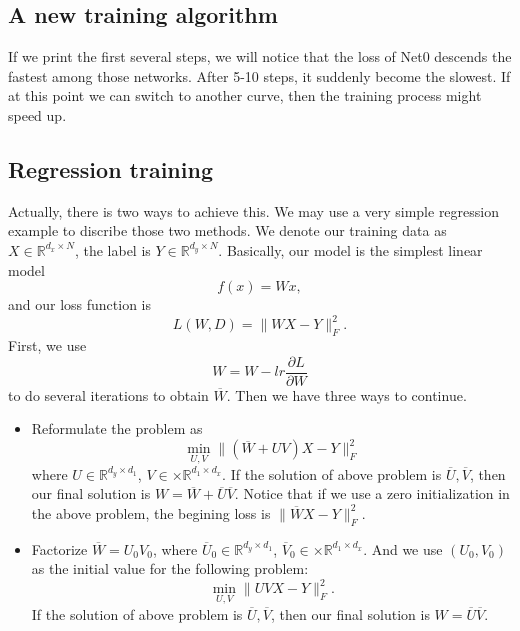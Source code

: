 \newpage
\subsection{A new training algorithm}

If we print the first several steps, we will notice that the loss of Net0 descends the fastest among those networks. After 5-10 steps, it suddenly become the slowest. If at this point we can switch to another curve, then the training process might speed up.\\

\subsection{Regression training}
Actually, there is two ways to achieve this. We may use a very simple regression example to discribe those two methods. We denote our training data as $X\in \mathbb{R}^{d_x\times N}$, the label is $Y\in \mathbb{R}^{d_y\times N}$. Basically, our model is the simplest linear model
\begin{equation}
	f(x) = Wx,
\end{equation}
and our loss function is 
\begin{equation}
	L(W, D) = \|WX - Y\|_F^2.
\end{equation}
First, we use 
\begin{equation}
	W = W - lr \frac{\partial L}{\partial W}
\end{equation}
to do several iterations to obtain $\overline{W}$. Then we have three ways to continue.\\
\begin{itemize}
	\item Reformulate the problem as 
	\begin{equation}
	\min_{U,V} \|(\overline{W}+ UV)X - Y\|_F^2
	\end{equation}
	where $U\in \mathbb{R}^{d_y\times d_1}$, $V\in\times \mathbb{R}^{d_1\times d_x}$. If the solution of above problem is $\overline{U}, \overline{V}$, then our final solution is $W = \overline{W}+\overline{U}\overline{V}$. Notice that if we use a zero initialization in the above problem, the begining loss is $\|\overline{W} X - Y\|_F^2$.\\
	\item Factorize $\overline{W} = U_0 V_0$, where $\overline{U}_0\in \mathbb{R}^{d_y\times d_1}$, $\overline{V}_0\in\times \mathbb{R}^{d_1\times d_x}$. And we use $(U_0,V_0)$ as the initial value for the following problem:
	\begin{equation}
	\min_{U,V} \|UVX - Y\|_F^2.
	\end{equation}
	If the solution of above problem is $\overline{U}, \overline{V}$, then our final solution is $W = {\overline{U}}{\overline{V}}$.
\end{itemize}

